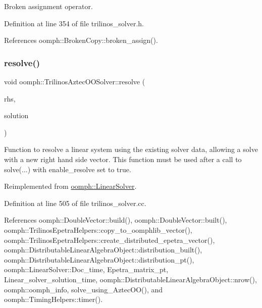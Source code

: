Broken assignment operator. 



Definition at line 354 of file trilinos\+\_\+solver.\+h.



References oomph\+::\+Broken\+Copy\+::broken\+\_\+assign().

\mbox{\label{classoomph_1_1TrilinosAztecOOSolver_a022f537f95c0bf352bab739f2f58bd7f}} 
\subsubsection{\texorpdfstring{resolve()}{resolve()}}
{\footnotesize\ttfamily void oomph\+::\+Trilinos\+Aztec\+O\+O\+Solver\+::resolve (\begin{DoxyParamCaption}\item[{const \hyperlink{classoomph_1_1DoubleVector}{Double\+Vector} \&}]{rhs,  }\item[{\hyperlink{classoomph_1_1DoubleVector}{Double\+Vector} \&}]{solution }\end{DoxyParamCaption})\hspace{0.3cm}{\ttfamily [virtual]}}



Function to resolve a linear system using the existing solver data, allowing a solve with a new right hand side vector. This function must be used after a call to solve(...) with enable\+\_\+resolve set to true. 



Reimplemented from \hyperlink{classoomph_1_1LinearSolver_a3b310d08333033edc119b2a5bd7dcbfb}{oomph\+::\+Linear\+Solver}.



Definition at line 505 of file trilinos\+\_\+solver.\+cc.



References oomph\+::\+Double\+Vector\+::build(), oomph\+::\+Double\+Vector\+::built(), oomph\+::\+Trilinos\+Epetra\+Helpers\+::copy\+\_\+to\+\_\+oomphlib\+\_\+vector(), oomph\+::\+Trilinos\+Epetra\+Helpers\+::create\+\_\+distributed\+\_\+epetra\+\_\+vector(), oomph\+::\+Distributable\+Linear\+Algebra\+Object\+::distribution\+\_\+built(), oomph\+::\+Distributable\+Linear\+Algebra\+Object\+::distribution\+\_\+pt(), oomph\+::\+Linear\+Solver\+::\+Doc\+\_\+time, Epetra\+\_\+matrix\+\_\+pt, Linear\+\_\+solver\+\_\+solution\+\_\+time, oomph\+::\+Distributable\+Linear\+Algebra\+Object\+::nrow(), oomph\+::oomph\+\_\+info, solve\+\_\+using\+\_\+\+Aztec\+O\+O(), and oomph\+::\+Timing\+Helpers\+::timer().

